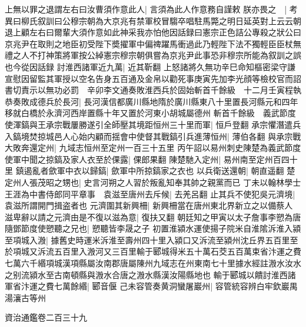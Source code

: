 上無以罪之退謂左右曰汝曹須作意此人|{
	言須為此人作意務自謹敕}
朕亦畏之　|{
	考異曰柳氏叙訓曰公穆宗朝為大京兆有禁軍校冒騶卒唱駐馬斃之明日延英對上云云朝退上顧左右曰爾輩大須作意如此神采我亦怕他因話録曰憲宗正色詰公專殺之狀公曰京兆尹在取則之地臣初受陛下奬擢軍中偏禆躍馬衝過此乃輕陛下法不獨輕臣臣杖無禮之人不打神策將軍按公綽憲宗穆宗朝俱嘗為京兆尹此事恐非穆宗所能為叙訓之誤也今從因話録}
討淮西諸軍近九萬|{
	近其靳翻}
上怒諸將久無功辛巳命知樞密梁守謙宣慰因留監其軍授以空名告身五百通及金帛以勸死事庚寅先加李光顔等檢校官而詔書切責示以無功必罰　辛卯李文通奏敗淮西兵於固始斬首千餘級　十二月壬寅程執恭奏敗成德兵於長河|{
	長河漢信都廣川縣地隋於廣川縣東八十里置長河縣元和四年移就白橋於永濟河西岸置縣十年又置於河東小胡城屬德州}
斬首千餘級　義武節度使渾鎬與王承宗戰屢勝遂引全師壓其境距恒州三十里而軍|{
	恒戶登翻}
承宗懼潛遣兵入鎬境焚掠城邑人心始内顧而揺會中使督其戰鎬引兵進薄恒州|{
	薄伯各翻}
與承宗戰大敗奔還定州|{
	九域志恒州至定州一百三十五里}
丙午詔以易州刺史陳楚為義武節度使軍中聞之掠鎬及家人衣至於倮露|{
	倮郎果翻}
陳楚馳入定州|{
	易州南至定州百四十里}
鎮遏亂者歛軍中衣以歸鎬|{
	歛軍中所掠鎬家之衣也}
以兵衛送還朝|{
	朝直遥翻}
楚定州人張茂昭之甥也|{
	史言河朔之人習於叛亂知奉其帥之親黨而已}
丁未以翰林學士王涯為中書侍郎同平章事　袁滋至唐州去斥候|{
	去羌呂翻}
止其兵不使犯吳元濟境|{
	袁滋所謂開門揖盗者也}
元濟圍其新興柵|{
	新興柵當在唐州東北界新立之以備蔡人}
滋卑辭以請之元濟由是不復以滋為意|{
	復扶又翻}
朝廷知之甲寅以太子詹事李愬為唐隨鄧節度使愬聽之兄也|{
	愬聽皆李晟之子}
初置淮潁水運使揚子院米自淮隂泝淮入潁至項城入溵|{
	據舊史時運米泝淮至壽州四十里入潁口又泝流至潁州沈丘界五百里至於項城又泝流五百里入溵河又三百里輸于郾城得米五十萬石茭五百萬束省汴運之費七萬六千緡項城漢項縣屬汝南郡唐屬陳州九域志在州東南七十里據水經註溵水汝水之别流潁水至古南頓縣與溵水合唐之溵水縣漢汝陽縣地也}
輸于郾城以饋討淮西諸軍省汴運之費七萬餘緡|{
	郾音偃}
己未容管奏黄洞蠻屠巖州|{
	容管統容辨白牢欽巖禺湯瀼古等州}


資治通鑑卷二百三十九
